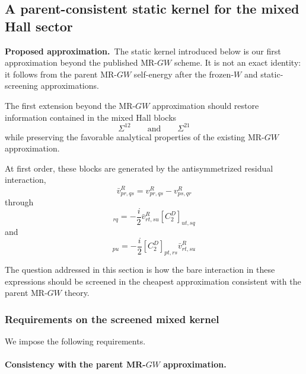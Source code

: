 \documentclass[aip,jcp,reprint,noshowkeys,superscriptaddress]{revtex4-1}
\newcommand{\Proposed}{\textbf{Proposed approximation.}\ }
\begin{document}
\subsection{A parent-consistent static kernel for the mixed Hall sector}
\label{sec:static-mixed-kernel}

\Proposed The static kernel introduced below is our first approximation
beyond the published MR-$GW$ scheme.  It is not an exact identity: it follows
from the parent MR-$GW$ self-energy after the frozen-$W$ and static-screening
approximations.


The first extension beyond the MR-$GW$ approximation should restore
information contained in the mixed Hall blocks
\begin{equation}
  \Sigma^{12}
  \qquad\text{and}\qquad
  \Sigma^{21}
\end{equation}
while preserving the favorable analytical properties of the existing
MR-$GW$ approximation.

At first order, these blocks are generated by the antisymmetrized
residual interaction,
\begin{equation}
  \bar v^R_{pr,qs}
  =
  v^R_{pr,qs}
  -
  v^R_{ps,qr}
  \label{eq:bare-antisym-residual}
\end{equation}
through
\begin{equation}
  [\Sigma^{12}_{1}]_{rq}
  =
  -\frac{i}{2}
  \bar v^R_{rt,su}
  [C_2^D]_{ut,sq}
\end{equation}
and
\begin{equation}
  [\Sigma^{21}_{1}]_{pu}
  =
  -\frac{i}{2}
  [C_2^D]_{pt,rs}
  \bar v^R_{rt,su}
\end{equation}

The question addressed in this section is how the bare interaction in
these expressions should be screened in the cheapest approximation
consistent with the parent MR-$GW$ theory.


\subsubsection{Requirements on the screened mixed kernel}

We impose the following requirements.

\paragraph{Consistency with the parent MR-\texorpdfstring{$GW$}{GW}
approximation.}
\end{document}
